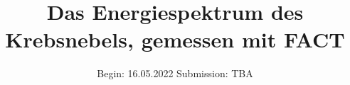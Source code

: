 


\title{Das Energiespektrum des Krebsnebels, gemessen mit FACT}
\date{%
  Begin: 16.05.2022
  \hspace{3em}
  Submission:  TBA
}



\maketitle
\thispagestyle{empty}
\tableofcontents
\newpage






\printbibliography{}



